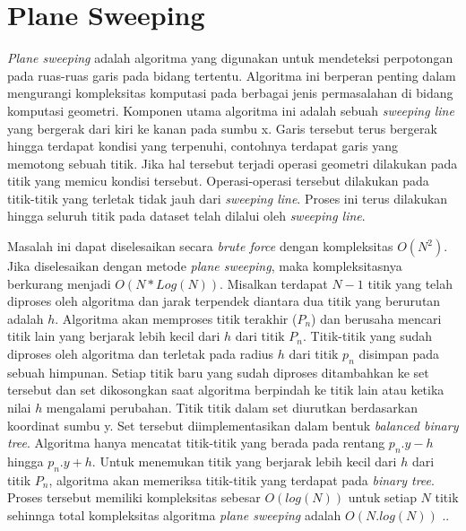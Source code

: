 \section{Plane Sweeping}
\label{sec:ps}
\textit{Plane sweeping} adalah algoritma yang digunakan untuk mendeteksi perpotongan pada ruas-ruas garis pada bidang tertentu. Algoritma ini berperan penting dalam mengurangi kompleksitas komputasi  pada berbagai jenis permasalahan di bidang komputasi geometri. Komponen utama algoritma ini adalah sebuah \textit{sweeping line} yang bergerak dari kiri ke kanan pada sumbu x. Garis tersebut terus bergerak hingga terdapat kondisi yang terpenuhi, contohnya terdapat garis yang memotong sebuah titik. Jika hal tersebut terjadi operasi geometri dilakukan pada titik yang memicu kondisi tersebut. Operasi-operasi tersebut dilakukan pada titik-titik yang terletak tidak jauh dari \textit{sweeping line}. Proses ini terus dilakukan hingga seluruh titik pada dataset telah dilalui oleh \textit{sweeping line}.

\par Masalah ini dapat diselesaikan secara \textit{brute force} dengan kompleksitas $O(N^{2})$. Jika diselesaikan dengan metode \textit{plane sweeping}, maka  kompleksitasnya berkurang menjadi $O(N*Log(N))$. Misalkan terdapat $N-1$ titik yang telah diproses oleh algoritma dan jarak terpendek diantara dua titik yang berurutan adalah $h$. Algoritma akan memproses titik terakhir ($P_{n}$) dan berusaha mencari titik lain yang berjarak lebih kecil dari $h$ dari titik $P_{n}$. Titik-titik yang sudah diproses oleh algoritma dan terletak pada radius $h$ dari titik $p_{n}$ disimpan pada sebuah himpunan. Setiap titik baru yang sudah diproses ditambahkan ke set  tersebut dan set dikosongkan saat algoritma berpindah ke titik lain atau ketika nilai $h$ mengalami perubahan. Titik titik dalam set diurutkan berdasarkan koordinat sumbu y. Set tersebut diimplementasikan dalam bentuk \textit{balanced binary tree}. Algoritma hanya mencatat titik-titik yang berada pada rentang $p_{n}.y-h$ hingga $p_{n}.y+h$. Untuk menemukan titik yang berjarak lebih kecil dari $h$ dari titik $P_{n}$, algoritma akan memeriksa titik-titik yang terdapat pada \textit{binary tree}. Proses tersebut memiliki kompleksitas sebesar $O(log(N))$ untuk setiap $N$ titik sehinnga total kompleksitas algoritma \textit{plane sweeping} adalah $O(N.log(N))$ \cite{flock_pattern_1:16}..

